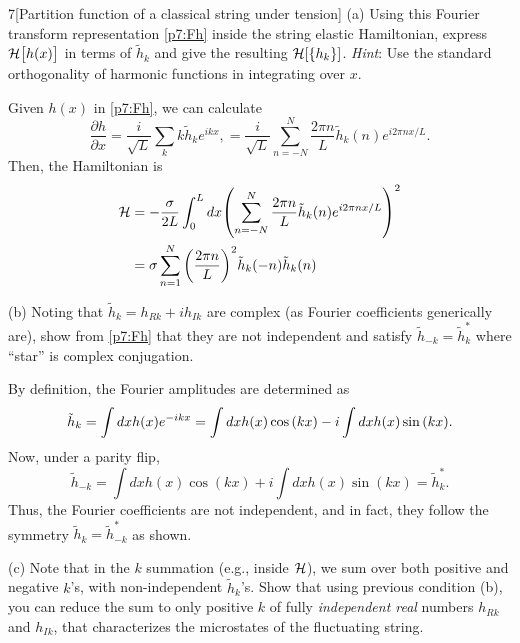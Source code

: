 \documentclass[12pt]{article}
\begin{document}
\begin{problem}{7}[Partition function of a classical string under tension]
(a) Using this Fourier transform representation \eqref{p7:Fh} inside the string
elastic Hamiltonian, express $\mathcal{H}\qty[h(x)]$ in terms of $\tilde{h}_k$ and give
the resulting $\mathcal{H}[\qty{h_k}]$. \textit{Hint}: Use the standard orthogonality
of harmonic functions in integrating over $x$.
\begin{solution}
Given $h(x)$ in \eqref{p7:Fh}, we can calculate
\begin{equation}
    \frac{\partial h}{\partial
    x}=\frac{i}{\sqrt{L}}\sum_{k}k\tilde{h}_ke^{ikx}, 
    =\frac{i}{\sqrt{L}}\sum_{n=-N}^N\frac{2\pi n}{L}\tilde{h}_k(n)e^{i2\pi
    nx/L}.
\end{equation}
Then, the Hamiltonian is
\begin{align}
    \mathcal{H}
    &=-\frac{\sigma}{2L}\int_0^Ldx\qty(\sum_{n=-N}^N\frac{2\pi
    n}{L}\tilde{h}_k(n)e^{i2\pi nx/L})^2\notag\\
    &=\sigma\sum_{n=1}^N\qty(\frac{2\pi
    n}{L})^2\tilde{h}_k(-n)\tilde{h}_k(n)
\end{align}
\end{solution}

(b) Noting that $\tilde{h}_k=h_{Rk}+ih_{Ik}$ are complex (as Fourier
coefficients generically are), show from \eqref{p7:Fh} that they are not
independent and satisfy $\tilde{h}_{-k}=\tilde{h}_{k}^\ast$ where ``star'' is
complex conjugation.
\begin{solution}
By definition, the Fourier amplitudes are determined as
\begin{equation}\label{p7b:hk}
    \tilde{h}_k=\int dxh(x)e^{-ikx}
    =\int dxh(x)\cos\qty(kx)-i\int dxh(x)\sin\qty(kx).
\end{equation}
Now, under a parity flip,
\begin{equation}
    \tilde{h}_{-k}=\int dxh(x)\cos(kx)+i\int dxh(x)\sin(kx)
    =\tilde{h}_k^\ast.
\end{equation}
Thus, the Fourier coefficients are not independent, and in fact, they follow the
symmetry $\tilde{h}_k=\tilde{h}_{-k}^\ast$ as shown.
\end{solution}

(c) Note that in the $k$ summation (e.g., inside $\mathcal{H}$), we sum over both
positive and negative $k$'s, with non-independent $\tilde{h}_k$'s. Show that
using previous condition (b), you can reduce the sum to only positive $k$ of
fully \textit{independent real} numbers $h_{Rk}$ and $h_{Ik}$, that
characterizes the microstates of the fluctuating string.


\end{problem}
\end{document}
